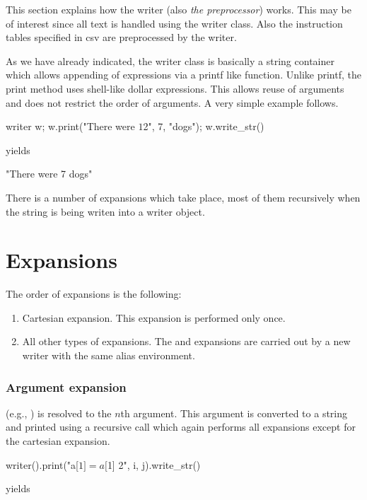 \label{sec:preprocessor}
This section explains how the writer (also \emph{the preprocessor}) works. This may be of interest since all text is handled using the writer class. Also the instruction tables specified in csv are preprocessed by the writer.

As we have already indicated, the writer class is basically a string container which allows appending of expressions via a printf like function. Unlike printf, the print method uses shell-like dollar expressions. This allows reuse of arguments and does not restrict the order of arguments. A very simple example follows.

\mybeginfig
\begin{code}
writer w;
w.print("There were $1 $2", 7, "dogs");
w.write_str()
\end{code}
yields
\begin{code}
"There were 7 dogs"
\end{code}

There is a number of expansions which take place, most of them recursively when the string is being writen into a writer object.

\section*{Expansions}

The order of expansions is the following:
\begin{enumerate}
\item Cartesian expansion. This expansion is performed only once.
\item All other types of expansions. The \ttt{\$\string{\string}} and \ttt{\$[]} expansions are carried out by a new writer with the same alias environment.
\end{enumerate}

\subsubsection{Argument expansion}

 (e.g., ) is resolved to the $n$th argument. This argument is converted to a string and printed using a recursive call which again performs all expansions except for the cartesian expansion.

\mybeginfig
\begin{code}
writer().print("a[$1] = a[$1] $ $2", i, j).write_str()
\end{code}
yields


